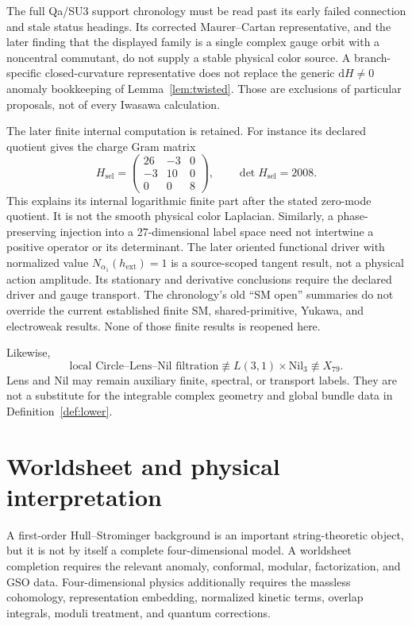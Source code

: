 \documentclass[11pt]{article}
\theoremstyle{definition}
\theoremstyle{remark}
\newcommand{\dd}{\mathrm d}
\begin{document}
The full Qa/SU3 support chronology \cite{FRQa} must be read past its early
failed connection and stale status headings.  Its corrected Maurer--Cartan
representative, and the later finding that the displayed family is a single
complex gauge orbit with a noncentral commutant, do not supply a stable
physical color source.  A branch-specific closed-curvature representative
does not replace the generic \(\dd H\ne0\) anomaly bookkeeping of
Lemma~\ref{lem:twisted}.  Those are exclusions of particular proposals,
not of every Iwasawa calculation.

The later finite internal computation is retained.  For instance its
declared quotient gives the charge Gram matrix
\[
H_{\mathrm{sel}}=
\begin{pmatrix}26&-3&0\\-3&10&0\\0&0&8\end{pmatrix},
\qquad \det H_{\mathrm{sel}}=2008.
\]
This explains its internal logarithmic finite part after the stated zero-mode
quotient.  It is not the smooth physical color Laplacian.  Similarly, a
phase-preserving injection into a 27-dimensional label space need not
intertwine a positive operator or its determinant.  The later oriented
functional driver with normalized value \(N_{\alpha_1}(h_{\mathrm{ext}})=1\)
is a source-scoped tangent result, not a physical action amplitude.  Its
stationary and derivative conclusions require the declared driver and
gauge transport.  The chronology's old ``SM open'' summaries do not
override the current established finite SM, shared-primitive, Yukawa, and
electroweak results.  None of those finite results is reopened here.

Likewise,
\[
\text{local Circle--Lens--Nil filtration}
\not\equiv L(3,1)\times\mathrm{Nil}_3
\not\equiv X_{79}.
\]
Lens and Nil may remain auxiliary finite, spectral, or transport labels.
They are not a substitute for the integrable complex geometry and global
bundle data in Definition~\ref{def:lower}.

\section{Worldsheet and physical interpretation}
\label{sec:physical}

A first-order Hull--Strominger background is an important string-theoretic
object, but it is not by itself a complete four-dimensional model.  A
worldsheet completion requires the relevant anomaly, conformal, modular,
factorization, and GSO data.  Four-dimensional physics additionally requires
the massless cohomology, representation embedding, normalized kinetic terms,
overlap integrals, moduli treatment, and quantum corrections.
\end{document}
